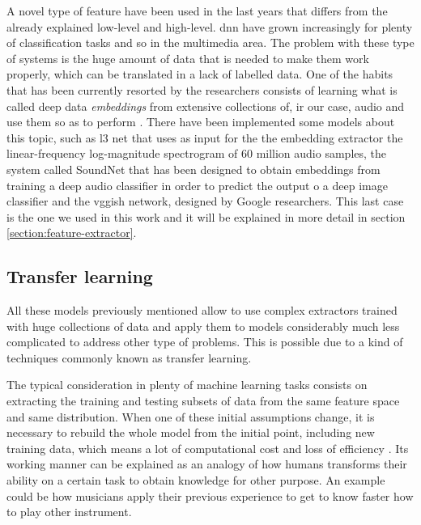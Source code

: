 	A novel type of feature have been used in the last years that differs from the already explained low-level and high-level. \acrfull{dnn} have grown increasingly for plenty of classification tasks and so in the multimedia area. The problem with these type of systems is the huge amount of data that is needed to make them work properly, which can be translated in a lack of labelled data. One of the habits that has been currently resorted by the researchers consists of learning what is called deep data \textit{embeddings} from extensive collections of, ir our case, audio and use them so as to perform . There have been implemented some models about this topic, such as \acrfull{l3} \cite{Cramer2019} net that uses as input for the the embedding extractor the linear-frequency log-magnitude spectrogram of 60 million audio samples, the system called SoundNet \cite{Aytar2016} that has been designed to obtain embeddings from training a deep audio classifier in order to predict the output o a deep image classifier and the \acrshort{vgg}ish network, designed by Google researchers. This last case is the one we used in this work and it will be explained in more detail in section \ref{section:feature-extractor}.
	
\subsection{Transfer learning}
\label{subsection:transfer-learning}

	All these models previously mentioned allow to use complex extractors trained with huge collections of data and apply them to models considerably much less complicated to address other type of problems. This is possible due to a kind of techniques commonly known as transfer learning.
	
	The typical consideration in plenty of machine learning tasks consists on extracting the training and testing subsets of data from the same feature space and same distribution. When one of these initial assumptions change, it is necessary to rebuild the whole model from the initial point, including new training data, which means a lot of computational cost and loss of efficiency \cite{Pan2010}. Its working manner can be explained as an analogy of how humans transforms their ability on a certain task to obtain knowledge for other purpose. An example could be how musicians apply their previous experience to get to know faster how to play other instrument.
	
